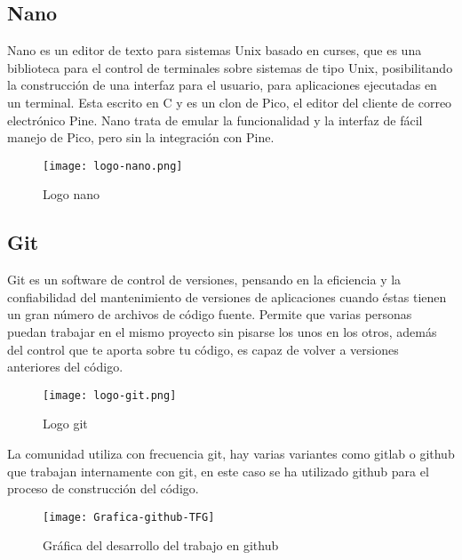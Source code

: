 \documentclass[ spanish, a4paper, 12pt, oneside]{report}
\begin{document}
\subsection{Nano}
Nano es un editor de texto para sistemas Unix basado en curses, que es una biblioteca para el control de terminales sobre sistemas de tipo Unix, posibilitando la construcción de una interfaz para el usuario, para aplicaciones ejecutadas en un terminal. Esta escrito en C y es un clon de Pico, 
el editor del cliente de correo electrónico Pine. Nano trata de emular la funcionalidad y la interfaz de fácil manejo de Pico, pero sin la integración con Pine. \\

\begin{figure}[!h]
   \centering
   \texttt{[image: logo-nano.png]}\\
      \caption{\label{fig: Logo nano} Logo nano}
\end{figure}

\subsection{Git}
Git es un software de control de versiones, pensando en la eficiencia y la confiabilidad del mantenimiento de versiones de aplicaciones cuando éstas tienen un gran número de archivos de código fuente. Permite que varias personas puedan trabajar en el mismo proyecto sin pisarse los unos en los otros, 
además del control que te aporta sobre tu código, es capaz de volver a versiones anteriores del código. \\

\begin{figure}[!h]
   \centering
   \texttt{[image: logo-git.png]}\\
      \caption{\label{fig: Logo git} Logo git}
\end{figure}

La comunidad utiliza con frecuencia git, hay varias variantes como gitlab o github que trabajan internamente con git, en este caso se ha utilizado github para el proceso de construcción del código.\\

\begin{figure}[!h]
   \centering
   \texttt{[image: Grafica-github-TFG]}\\
      \caption{\label{fig: Gráfica github} Gráfica del desarrollo del trabajo en github}
\end{figure}
\end{document}

